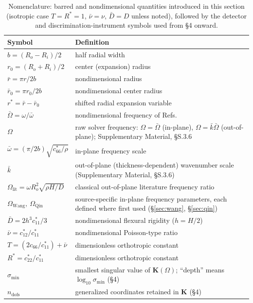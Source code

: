 \documentclass[11pt]{article}
\begin{document}
\begin{table}[h]\centering\footnotesize
\renewcommand{\arraystretch}{0.92}
\caption{Nomenclature: barred and nondimensional quantities introduced in
this section (isotropic case $T=R^{*}=1$, $\bar\nu=\nu$, $\bar D=D$ unless
noted), followed by the detector and discrimination-instrument symbols
used from \S4 onward.}
\label{tab:nomenclature}
\begin{tabularx}{\linewidth}{@{}lX@{}}
\toprule Symbol & Definition\\ \midrule
$b=(R_o-R_i)/2$ & half radial width\\
$r_0=(R_o+R_i)/2$ & center (expansion) radius\\
$\bar r=\pi r/2b$ & nondimensional radius\\
$\bar r_0=\pi r_0/2b$ & nondimensional center radius\\
$r^{*}=\bar r-\bar r_0$ & shifted radial expansion variable\\
$\bar\Omega=\omega/\bar\omega$ & nondimensional frequency of Refs.~\cite{seok1,seok2}\\
$\Omega$ & raw solver frequency: $\Omega=\bar\Omega$ (in-plane),
$\Omega=\bar k\bar\Omega$ (out-of-plane); Supplementary Material, §S.3.6\\
$\bar\omega=(\pi/2b)\sqrt{c^{*}_{66}/\rho}$ & in-plane frequency scale\\
$\bar k$ & out-of-plane (thickness-dependent) wavenumber scale (Supplementary Material, §S.3.6)\\
$\Omega_{\mathrm{lit}}=\omega R_o^2\sqrt{\rho H/D}$ & classical out-of-plane literature frequency ratio\\
$\Omega_{\mathrm{Wang}},\ \Omega_{\mathrm{Qin}}$ & source-specific in-plane frequency parameters, each defined where first used (\S\ref{sec:wang}, \S\ref{sec:qin})\\
$\bar D=2h^{3}c^{*}_{11}/3$ & nondimensional flexural rigidity ($h=H/2$)\\
$\bar\nu=c^{*}_{12}/c^{*}_{11}$ & nondimensional Poisson-type ratio\\
$T=(2c_{66}/c^{*}_{11})+\bar\nu$ & dimensionless orthotropic constant\\
$R^{*}=c^{*}_{22}/c^{*}_{11}$ & dimensionless orthotropic constant\\
\addlinespace[2pt]
$\sigma_{\min}$ & smallest singular value of $\mathbf{K}(\Omega)$; ``depth'' means $\log_{10}\sigma_{\min}$ (\S4)\\
$n_{\mathrm{dofs}}$ & generalized coordinates retained in $\mathbf{K}$ (\S4)\\

\end{tabularx}
\end{table}
\end{document}
